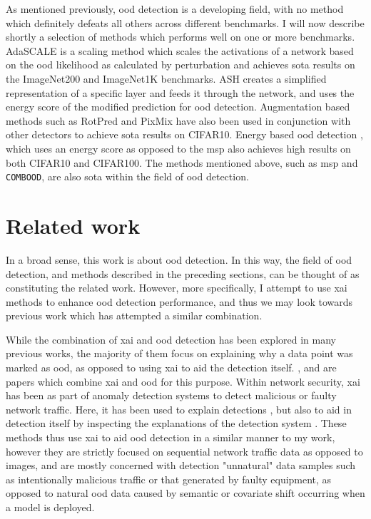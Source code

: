 \documentclass[UKenglish]{uiomasterthesis} %
\theoremstyle{definition}
\begin{document}
As mentioned previously, \ac{ood} detection is a developing field, with no method which definitely defeats all others across different benchmarks. I will now describe shortly a selection of methods which performs well on one or more benchmarks. AdaSCALE \cite{adascale} is a scaling method which scales the activations of a network based on the \ac{ood} likelihood as calculated by perturbation and achieves \ac{sota} results on the ImageNet200 and ImageNet1K benchmarks. ASH \cite{ash} creates a simplified representation of a specific layer and feeds it through the network, and uses the energy score of the modified prediction for \ac{ood} detection. Augmentation based methods such as RotPred \cite{rotpred} and PixMix \cite{pixmix} have also been used in conjunction with other detectors to achieve \ac{sota} results on CIFAR10. Energy based \ac{ood} detection \cite{energy}, which uses an energy score as opposed to the \ac{msp} also achieves high results on both CIFAR10 and CIFAR100. The methods mentioned above, such as \ac{msp} and \texttt{COMBOOD}, are also \ac{sota} within the field of \ac{ood} detection.

\section{Related work} \label{section:relatedwork}

In a broad sense, this work is about \ac{ood} detection. In this way, the field of \ac{ood} detection, and methods described in the preceding sections, can be thought of as constituting the related work. However, more specifically, I attempt to use \ac{xai} methods to enhance \ac{ood} detection performance, and thus we may look towards previous work which has attempted a similar combination.

While the combination of \ac{xai} and \ac{ood} detection has been explored in many previous works, the majority of them focus on explaining why a data point was marked as \ac{ood}, as opposed to using \ac{xai} to aid the detection itself. \cite{uncertainty}, \cite{generalxaiforood} and \cite{tallon2020explainable} are papers which combine \ac{xai} and \ac{ood} for this purpose. Within network security, \ac{xai} has been as part of anomaly detection systems to detect malicious or faulty network traffic. Here, it has been used to explain detections \cite{idsxai, mahbooba}, but also to aid in detection itself by inspecting the explanations of the detection system \cite{tcydenova2021detection, dnsxai}. These methods thus use \ac{xai} to aid \ac{ood} detection in a similar manner to my work, however they are strictly focused on sequential network traffic data as opposed to images, and are mostly concerned with detection "unnatural" data samples such as intentionally malicious traffic or that generated by faulty equipment, as opposed to natural \ac{ood} data caused by semantic or covariate shift occurring when a model is deployed.
\end{document}

